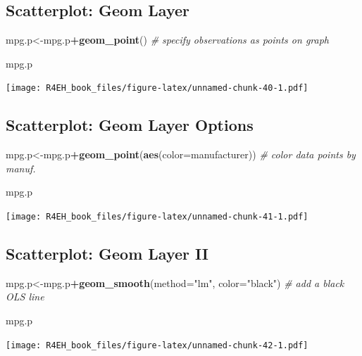\documentclass[]{book}
\newenvironment{Shaded}{\begin{snugshade}}{\end{snugshade}}
\newcommand{\KeywordTok}[1]{\textcolor[rgb]{0.13,0.29,0.53}{\textbf{#1}}}
\newcommand{\DataTypeTok}[1]{\textcolor[rgb]{0.13,0.29,0.53}{#1}}
\newcommand{\StringTok}[1]{\textcolor[rgb]{0.31,0.60,0.02}{#1}}
\newcommand{\CommentTok}[1]{\textcolor[rgb]{0.56,0.35,0.01}{\textit{#1}}}
\newcommand{\OperatorTok}[1]{\textcolor[rgb]{0.81,0.36,0.00}{\textbf{#1}}}
\newcommand{\NormalTok}[1]{#1}
\theoremstyle{definition}
\theoremstyle{definition}
\theoremstyle{definition}
\theoremstyle{remark}
\begin{document}
\subsection{Scatterplot: Geom Layer}\label{scatterplot-geom-layer}

\begin{Shaded}
\begin{Highlighting}[]
\NormalTok{mpg.p<-mpg.p}\OperatorTok{+}\KeywordTok{geom_point}\NormalTok{() }\CommentTok{# specify observations as points on graph}

\NormalTok{mpg.p}
\end{Highlighting}
\end{Shaded}

\texttt{[image: R4EH\_book\_files/figure-latex/unnamed-chunk-40-1.pdf]}

\subsection{Scatterplot: Geom Layer
Options}\label{scatterplot-geom-layer-options}

\begin{Shaded}
\begin{Highlighting}[]
\NormalTok{mpg.p<-mpg.p}\OperatorTok{+}\KeywordTok{geom_point}\NormalTok{(}\KeywordTok{aes}\NormalTok{(}\DataTypeTok{color=}\NormalTok{manufacturer)) }\CommentTok{# color data points by manuf.}

\NormalTok{mpg.p}
\end{Highlighting}
\end{Shaded}

\texttt{[image: R4EH\_book\_files/figure-latex/unnamed-chunk-41-1.pdf]}

\subsection{Scatterplot: Geom Layer II}\label{scatterplot-geom-layer-ii}

\begin{Shaded}
\begin{Highlighting}[]
\NormalTok{mpg.p<-mpg.p}\OperatorTok{+}\KeywordTok{geom_smooth}\NormalTok{(}\DataTypeTok{method=}\StringTok{"lm"}\NormalTok{, }\DataTypeTok{color=}\StringTok{"black"}\NormalTok{) }\CommentTok{# add a black OLS line }

\NormalTok{mpg.p}
\end{Highlighting}
\end{Shaded}

\texttt{[image: R4EH\_book\_files/figure-latex/unnamed-chunk-42-1.pdf]}
\end{document}
